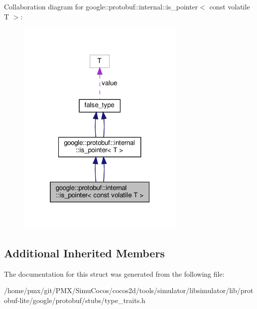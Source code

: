 Collaboration diagram for google\+:\+:protobuf\+:\+:internal\+:\+:is\+\_\+pointer$<$ const volatile T $>$\+:
\nopagebreak
\begin{figure}[H]
\begin{center}
\leavevmode
\includegraphics[width=229pt]{structgoogle_1_1protobuf_1_1internal_1_1is__pointer_3_01const_01volatile_01T_01_4__coll__graph}
\end{center}
\end{figure}
\subsection*{Additional Inherited Members}


The documentation for this struct was generated from the following file\+:\begin{DoxyCompactItemize}
\item 
/home/pmx/git/\+P\+M\+X/\+Simu\+Cocos/cocos2d/tools/simulator/libsimulator/lib/protobuf-\/lite/google/protobuf/stubs/type\+\_\+traits.\+h\end{DoxyCompactItemize}

